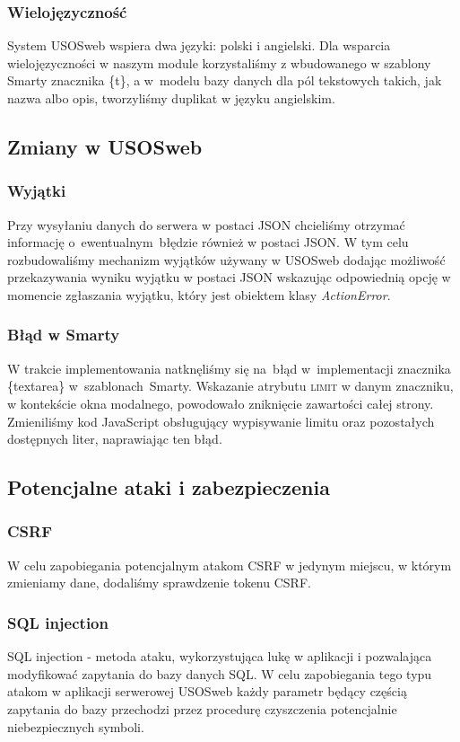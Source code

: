 \documentclass[licencjacka]{pracamgr}
\begin{document}
\subsubsection{Wielojęzyczność}
System USOSweb wspiera dwa języki: polski i angielski. Dla wsparcia wielojęzyczności w naszym module korzystaliśmy z wbudowanego w szablony Smarty znacznika \{t\}, a w~modelu bazy danych dla pól tekstowych takich, jak nazwa albo opis, tworzyliśmy duplikat w języku angielskim.
\subsection{Zmiany w USOSweb}
\subsubsection{Wyjątki}
Przy wysyłaniu danych do serwera w postaci JSON chcieliśmy otrzymać informację o~ewentualnym~błędzie również w postaci JSON. W tym celu rozbudowaliśmy mechanizm wyjątków używany w USOSweb dodając możliwość przekazywania wyniku wyjątku w postaci JSON wskazując odpowiednią opcję w momencie zgłaszania wyjątku, który jest obiektem klasy \textsl{ActionError}.
\subsubsection{Błąd w Smarty}
W trakcie implementowania natknęliśmy się na~błąd w~implementacji znacznika \{textarea\} w~szablonach~Smarty. Wskazanie atrybutu \textsc{limit} w danym znaczniku, w kontekście okna modalnego, powodowało zniknięcie zawartości całej strony. Zmieniliśmy kod JavaScript obsługujący wypisywanie limitu oraz pozostałych dostępnych liter, naprawiając ten błąd.
\subsection{Potencjalne ataki i zabezpieczenia} \label{subsec:bezpiecz}
\subsubsection{CSRF}
W celu zapobiegania potencjalnym atakom CSRF w jedynym miejscu, w którym zmieniamy dane, dodaliśmy sprawdzenie tokenu CSRF.
\subsubsection{SQL injection}
SQL injection - metoda ataku, wykorzystująca lukę w aplikacji i pozwalająca modyfikować zapytania do bazy danych SQL.
W celu zapobiegania tego typu atakom w aplikacji serwerowej USOSweb każdy parametr będący częścią zapytania do bazy przechodzi przez procedurę czyszczenia potencjalnie niebezpiecznych symboli.
\end{document}
